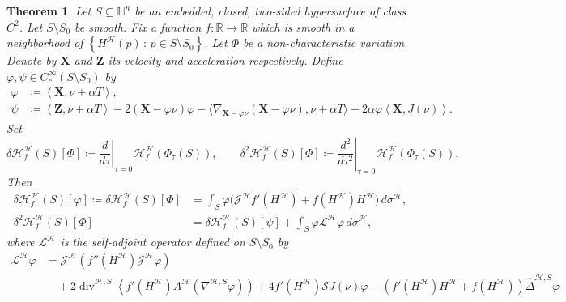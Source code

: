 \documentclass[11pt]{amsart}
\newcommand{\hhh}{{\mathcal{H}}}
\newcommand{\tmc}{{\mathscr{H}}}
\newcommand{\vh}{\nu}
\newcommand{\rr}{{\mathbb{R}}}
\newcommand{\hh}{{\mathbb{H}}}
\newcommand{\s}{\mathcal S}
\newcommand{\X}{\mathbf{X}}
\newcommand{\Z}{\mathbf{Z}}
\DeclareMathOperator{\divv}{div}
\newcommand{\jacobi}{\mathcal{J}}
\newtheorem{theorem}{Theorem}[section]
\theoremstyle{definition}
\theoremstyle{remark}
\numberwithin{equation}{section}
\begin{document}
\begin{theorem}\label{teoremavariazionigeneralimainsubriem}
        Let $S\subseteq\hh^n$ be an embedded, closed, two-sided hypersurface of class $C^2$. Let $S\setminus S_0$ be smooth. Fix a function $f:\rr\to\rr$ which is smooth in a neighborhood of $\left\{H^\hhh(p)\,:\,p\in S\setminus S_0\right\}$. Let $\Phi$ be a non-characteristic variation.  Denote by $\X$ and $\Z$ its velocity and acceleration respectively. Define $\varphi,\psi\in C^\infty_c(S\setminus S_0)$ by
        \begin{equation*}\label{lefunzioniimportanti}
        \begin{split}        \varphi&\coloneqq\left\langle \X,\vh+\alpha T\right\rangle,\\
            \psi&\coloneqq \left\langle\Z,\vh+\alpha T\right\rangle-2\left(\X-\varphi\vh\right)\varphi-\Big\langle\nabla_{\X-\varphi\vh}\left(\X-\varphi\vh\right),\vh+\alpha T\Big\rangle-2\alpha\varphi\left\langle \X,J(\vh)\right\rangle.
        \end{split}
        \end{equation*}
               Set 
        \begin{equation*}
 \delta\tmc^\hhh_f(S)[\Phi]\coloneqq \left.\frac{d}{d\tau}\right|_{\tau=0}\tmc^\hhh_f\left(\Phi_\tau(S)\right),\qquad   \delta^2\tmc^\hhh_f(S)[\Phi]\coloneqq \left.\frac{d^2}{d\tau^2}\right|_{\tau=0}\tmc^\hhh_f\left(\Phi_\tau(S)\right).
\end{equation*} 
        Then 
            \begin{align}            \delta\tmc^\hhh_f(S)[\varphi]\coloneqq\delta\tmc^\hhh_f(S)[\Phi]&=  \int_S\varphi\Big(\jacobi^\hhh f'(H^\hhh)+f(H^\hhh) H^\hhh\Big)\,d\sigma^\hhh,\label{variazprimasubriemmain}\\
            \delta^2\tmc_f^\hhh(S)[\Phi]&=\delta\tmc^\hhh_f(S)\left[\psi\right]+\int_S\varphi\mathcal L^\hhh\varphi\,d\sigma^\hhh, \label{variazionesecondasubriemannianamain}
    \end{align}
    where $ \mathcal L^\hhh$ is the self-adjoint operator defined on $S\setminus S_0$ by
    \begin{equation*}
        \begin{split}
            \mathcal L^\hhh\varphi&=\jacobi^\hhh\left(f''(H^\hhh)\jacobi^\hhh\varphi\right)\\
            &\quad+2\divv^{\hhh,S} \left\langle f'(H^\hhh)A^\hhh\left(\nabla^{\hhh,S}\varphi\right)\right)+4 f'(H^\hhh)\s J(\vh)\varphi-\left(f'(H^\hhh)H^\hhh+f(H^\hhh)\right)\hat\Delta^{\hhh,S}\varphi\\

\end{split}
\end{equation*}
\end{theorem}
\end{document}
